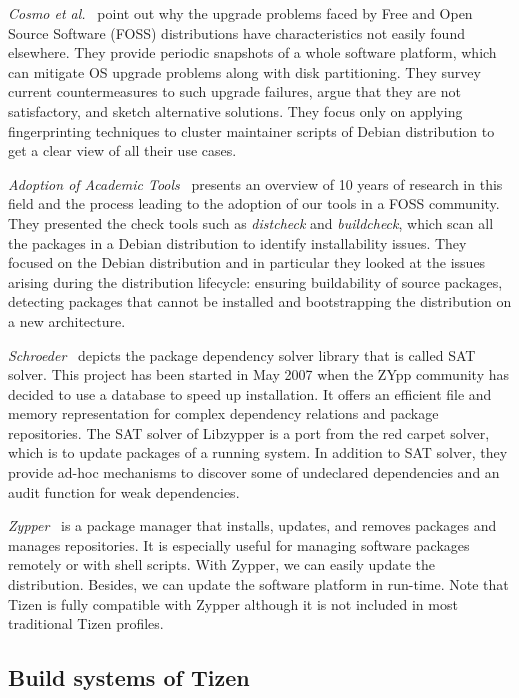 \textit{Cosmo et al.}~\cite{14DiCosmo2008PUF} point out why the upgrade problems faced by Free and Open Source Software (FOSS) distributions have characteristics not easily found elsewhere.
They provide periodic snapshots of a whole software platform, which can mitigate OS upgrade problems along with disk partitioning.
They survey current countermeasures to such upgrade failures, argue that they are not satisfactory, and sketch alternative solutions.
They focus only on applying fingerprinting techniques to cluster maintainer scripts of Debian distribution to get a clear view of all their use cases.


\textit{Adoption of Academic Tools}~\cite{15abate2017debian} presents an overview of 10 years of research in this field and the process leading to the adoption of our tools in a FOSS community.
They presented the check tools such as \textit{distcheck} and \textit{buildcheck}, which scan all the packages in a Debian distribution to identify installability issues.
They focused on the Debian distribution and in particular they looked at the issues arising during the distribution lifecycle: ensuring buildability of source packages, detecting packages that cannot be installed and bootstrapping the distribution on a new architecture. 


\textit{Schroeder}~\cite{16Schroeder2007SatSolverURL} depicts the package dependency solver library that is called SAT solver.
This project has been started in May 2007 when the ZYpp community has decided to use a database to speed up installation.
It offers an efficient file and memory representation for complex dependency relations and package repositories.
The SAT solver of Libzypper is a port from the red carpet solver, which is to update packages of a running system.
In addition to SAT solver, they provide ad-hoc mechanisms to discover some of undeclared dependencies and an audit function for weak dependencies.


\textit{Zypper}~\cite{20Zypper_URL} is a package manager that installs, updates, and removes packages and manages repositories.
It is especially useful for managing software packages remotely or with shell scripts.
With Zypper, we can easily update the distribution.
Besides, we can update the software platform in run-time.
Note that Tizen is fully compatible with Zypper although it is not included in most traditional Tizen profiles.

\subsection{Build systems of Tizen}

